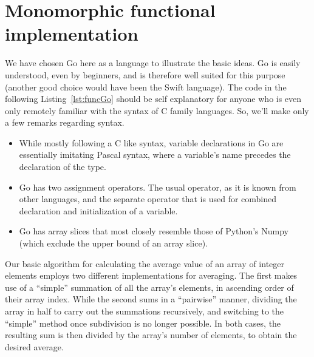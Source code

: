 \documentclass[11pt,oneside]{report}
\newcommand{\code}[1]{{\selectfont\ttfamily{#1}}}
\begin{document}
\section{Monomorphic functional implementation}
\label{sect:mono_functional}

We have chosen Go here as a language to illustrate the basic ideas.
Go is easily understood, even by beginners, and is therefore well
suited for this purpose (another good choice would have been the Swift
language). The code in the following Listing~\ref{lst:funcGo} should
be self explanatory for anyone who is even only remotely familiar with
the syntax of C family languages. So, we'll make only a few remarks
regarding syntax.
\begin{itemize}
\item
  While mostly following a C like syntax, variable declarations in Go
  are essentially imitating Pascal syntax, where a variable's name
  precedes the declaration of the type.
\item
  Go has two assignment operators. The usual \code{=} operator, as it
  is known from other languages, and the separate operator \code{:=}
  that is used for combined declaration and initialization of a
  variable.
\item
  Go has array slices that most closely resemble those of Python's
  Numpy (which exclude the upper bound of an array slice).
\end{itemize}

Our basic algorithm for calculating the average value of an array of
integer elements employs two different implementations for
averaging. The first makes use of a ``simple'' summation of all the
array's elements, in ascending order of their array index. While the
second sums in a ``pairwise'' manner, dividing the array in half to
carry out the summations recursively, and switching to the ``simple''
method once subdivision is no longer possible. In both cases, the
resulting sum is then divided by the array's number of elements, to
obtain the desired average.


\end{document}
